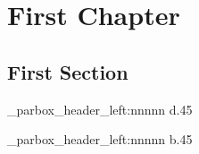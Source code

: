 \documentclass{book}
\begin{document}
\pagestyle{test}
\chapter{First Chapter}
\lipsum[1-6]
\section{First Section}
\lipsum[1-20]
\ExplSyntaxOn
\fboxsep=0pt
\fbox
  {
    \phdh_parbox_header_left:nnnnn {d}{.45\textwidth}{
       \relax}{\raggedright}{\lorem}
  }
\fbox
  {
    \phdh_parbox_header_left:nnnnn {b}{.45\textwidth}{\relax}{
       \raggedleft}{\lorem}
  }
\ExplSyntaxOff
\end{document}
